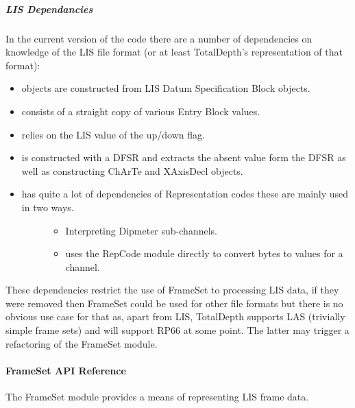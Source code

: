 \documentclass[letterpaper,10pt,english]{sphinxmanual}
\begin{document}
\subparagraph{LIS Dependancies}
\label{\detokenize{ref/LIS/core/FrameSet:lis-dependancies}}
In the current version of the code there are a number of dependencies on knowledge of the LIS file format (or at least TotalDepth’s representation of that format):
\begin{itemize}
\item {} 
 objects are constructed from LIS Datum Specification Block objects.

\item {} 
 consists of a straight copy of various Entry Block values.

\item {} 
 relies on the LIS value of the up/down flag.

\item {} 
 is constructed with a DFSR and extracts the absent value form the DFSR as well as constructing ChArTe and XAxisDecl objects.

\item {} \begin{description}
\item[{ has quite a lot of dependencies of Representation codes these are mainly used in two ways.}] \leavevmode\begin{itemize}
\item {} 
Interpreting Dipmeter sub-channels.

\item {} 
 uses the RepCode module directly to convert bytes to values for a channel.

\end{itemize}

\end{description}

\end{itemize}

These dependencies restrict the use of FrameSet to processing LIS data, if they were removed then FrameSet could be used for other file formats but there is no obvious use case for that as, apart from LIS, TotalDepth supports LAS (trivially simple frame sets) and will support RP66 at some point. The latter may trigger a refactoring of the FrameSet module.


\paragraph{FrameSet API Reference}
\label{\detokenize{ref/LIS/core/FrameSet:module-TotalDepth.LIS.core.FrameSet}}\label{\detokenize{ref/LIS/core/FrameSet:frameset-api-reference}}
The FrameSet module provides a means of representing LIS frame data.
\end{document}
